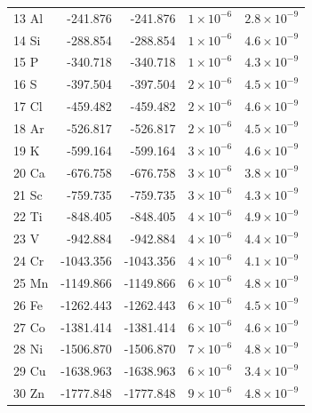 \begin{longtable}{l r r r r}
13 Al       &     -241.876        &   -241.876        &   $1\times10^{-6}$      &   $2.8\times10^{-9}$    \\
14 Si       &     -288.854        &   -288.854        &   $1\times10^{-6}$      &   $4.6\times10^{-9}$    \\
15 P        &     -340.718        &   -340.718        &   $1\times10^{-6}$      &   $4.3\times10^{-9}$    \\
16 S        &     -397.504        &   -397.504        &   $2\times10^{-6}$      &   $4.5\times10^{-9}$    \\
17 Cl       &     -459.482        &   -459.482        &   $2\times10^{-6}$      &   $4.6\times10^{-9}$    \\
18 Ar       &     -526.817        &   -526.817        &   $2\times10^{-6}$      &   $4.5\times10^{-9}$    \\
19 K        &     -599.164        &   -599.164        &   $3\times10^{-6}$      &   $4.6\times10^{-9}$    \\
20 Ca       &     -676.758        &   -676.758        &   $3\times10^{-6}$      &   $3.8\times10^{-9}$    \\
21 Sc       &     -759.735        &   -759.735        &   $3\times10^{-6}$      &   $4.3\times10^{-9}$    \\
22 Ti       &     -848.405        &   -848.405        &   $4\times10^{-6}$      &   $4.9\times10^{-9}$    \\
23 V        &     -942.884        &   -942.884        &   $4\times10^{-6}$      &   $4.4\times10^{-9}$    \\
24 Cr       &    -1043.356        &  -1043.356        &   $4\times10^{-6}$      &   $4.1\times10^{-9}$    \\
25 Mn       &    -1149.866        &  -1149.866        &   $6\times10^{-6}$      &   $4.8\times10^{-9}$    \\
26 Fe       &    -1262.443        &  -1262.443        &   $6\times10^{-6}$      &   $4.5\times10^{-9}$    \\
27 Co       &    -1381.414        &  -1381.414        &   $6\times10^{-6}$      &   $4.6\times10^{-9}$    \\
28 Ni       &    -1506.870        &  -1506.870        &   $7\times10^{-6}$      &   $4.8\times10^{-9}$    \\
29 Cu       &    -1638.963        &  -1638.963        &   $6\times10^{-6}$      &   $3.4\times10^{-9}$    \\
30 Zn       &    -1777.848        &  -1777.848        &   $9\times10^{-6}$      &   $4.8\times10^{-9}$    \\

\end{longtable}
